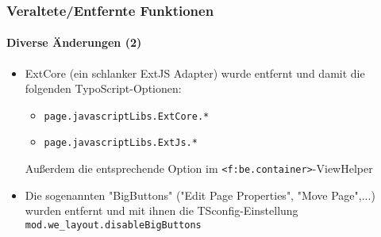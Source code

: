 \begin{frame}[fragile]
	\frametitle{Veraltete/Entfernte Funktionen}
	\framesubtitle{Diverse Änderungen (2)}

	\begin{itemize}

		\item ExtCore (ein schlanker ExtJS Adapter) wurde entfernt und damit die folgenden TypoScript-Optionen:

			\begin{itemize}
				\item \texttt{page.javascriptLibs.ExtCore.*}
				\item \texttt{page.javascriptLibs.ExtJs.*}
			\end{itemize}

			Außerdem die entsprechende Option im \texttt{<f:be.container>}-ViewHelper

		\item Die sogenannten "BigButtons" ("Edit Page Properties", "Move Page",...) wurden entfernt
			und mit ihnen die TSconfig-Einstellung \texttt{mod.we\_layout.disableBigButtons}

	\end{itemize}

\end{frame}


